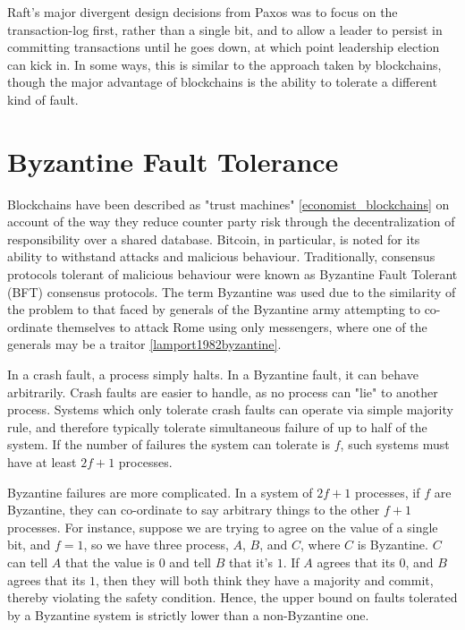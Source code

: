 Raft's major divergent design decisions from Paxos was to focus on the transaction-log first, rather than a single bit,
and to allow a leader to persist in committing transactions until he goes down, at which point leadership election can kick in. 
In some ways, this is similar to the approach taken by blockchains, 
though the major advantage of blockchains is the ability to tolerate a different kind of fault.

\section{Byzantine Fault Tolerance}

Blockchains have been described as "trust machines" \ref{economist_blockchains} on account of the way they reduce counter party risk through the decentralization of responsibility over a shared database.
Bitcoin, in particular, is noted for its ability to withstand attacks and malicious behaviour. 
Traditionally, consensus protocols tolerant of malicious behaviour were known as Byzantine Fault Tolerant (BFT) consensus protocols.
The term Byzantine was used due to the similarity of the problem to that faced by generals of the Byzantine army attempting to co-ordinate themselves to attack Rome using only messengers,
where one of the generals may be a traitor \ref{lamport1982byzantine}.

In a crash fault, a process simply halts. In a Byzantine fault, it can behave arbitrarily.
Crash faults are easier to handle, as no process can "lie" to another process.
Systems which only tolerate crash faults can operate via simple majority rule, 
and therefore typically tolerate simultaneous failure of up to half of the system.
If the number of failures the system can tolerate is $f$, such systems must have at least $2f+1$ processes.

Byzantine failures are more complicated. In a system of $2f+1$ processes, if $f$ are Byzantine, 
they can co-ordinate to say arbitrary things to the other $f+1$ processes.
For instance, suppose we are trying to agree on the value of a single bit, 
and $f=1$, so we have three process, $A$, $B$, and $C$, where $C$ is Byzantine.
$C$ can tell $A$ that the value is $0$ and tell $B$ that it's $1$. 
If $A$ agrees that its $0$, and $B$ agrees that its $1$, then they will both think they have a majority and commit, 
thereby violating the safety condition.
Hence, the upper bound on faults tolerated by a Byzantine system is strictly lower than a non-Byzantine one.

